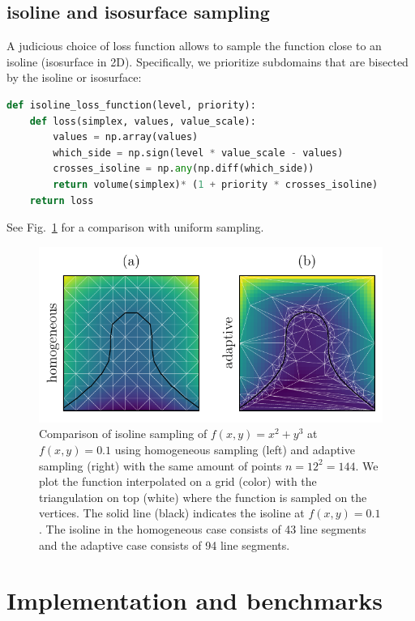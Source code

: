 \subsection{isoline and isosurface sampling}

A judicious choice of loss function allows to sample the function close to an isoline (isosurface in 2D). Specifically, we prioritize subdomains that are bisected by the isoline or isosurface:

\begin{lstlisting}[language=Python]
def isoline_loss_function(level, priority):
    def loss(simplex, values, value_scale):
        values = np.array(values)
        which_side = np.sign(level * value_scale - values)
        crosses_isoline = np.any(np.diff(which_side))
        return volume(simplex)* (1 + priority * crosses_isoline)
    return loss
\end{lstlisting}

See Fig.~\ref{fig:isoline} for a comparison with uniform sampling.

\begin{figure}
\centering
\includegraphics{chapter_adaptive/figures/isoline.pdf}
\caption{Comparison of isoline sampling of $f(x,y)=x^2 + y^3$ at $f(x,y)=0.1$ using homogeneous sampling (left) and adaptive sampling (right) with the same amount of points $n=12^2=144$.
We plot the function interpolated on a grid (color) with the triangulation on top (white) where the function is sampled on the vertices.
The solid line (black) indicates the isoline at $f(x,y)=0.1$.
The isoline in the homogeneous case consists of 43 line segments and the adaptive case consists of 94 line segments.\label{fig:isoline}}
\end{figure}

\section{Implementation and benchmarks}


